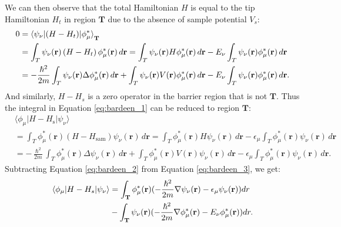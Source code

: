 We can then observe that the total Hamiltonian $H$ is equal to the tip Hamiltonian $H_t$ in region $\mathbf{T}$ due to the absence of sample potential $V_s$: 
\begin{equation}
	\label{eq:bardeen_2}
	\begin{aligned}
		0 &= \braket{\psi_{\nu}|(H-H_t)|\phi_{\mu}^*}_{\mathbf{T}}\\
		 &= \int_{T} \psi_{\nu}(\mathbf{r}) \left( H - H_{t} \right) \phi_{\mu}^*(\mathbf{r}) \, d\mathbf{r} 
		= \int_{T} \psi_{\nu}(\mathbf{r}) H \phi_{\mu}^*(\mathbf{r}) \, d\mathbf{r} 
		- E_{\nu} \int_{T} \psi_{\nu}(\mathbf{r}) \phi_{\mu}^*(\mathbf{r}) \, d\mathbf{r} \\
		&= -\frac{\hslash^2}{2m} \int_{T} \psi_{\nu}(\mathbf{r}) \Delta \phi_{\mu}^*(\mathbf{r}) \, d\mathbf{r} 
		+ \int_{T} \psi_{\nu}(\mathbf{r}) V(\mathbf{r}) \phi_{\mu}^*(\mathbf{r}) \, d\mathbf{r} 
		- E_{\nu} \int_{T} \psi_{\nu}(\mathbf{r}) \phi_{\mu}^*(\mathbf{r}) \, d\mathbf{r}.
	\end{aligned}
\end{equation}
And similarly, $H - H_s$ is a zero operator in the barrier region that is not $\mathbf{T}$. Thus the integral in Equation \ref{eq:bardeen_1} can be reduced to region $\mathbf{T}$:   
\begin{equation}
	\label{eq:bardeen_3}
	\begin{aligned}
		&\langle \phi_{\mu} | H - H_{\text{s}} | \psi_{\nu} \rangle \\
		&= \int_{T} \phi_{\mu}^*(\mathbf{r}) \left( H - H_{\text{sam}} \right) \psi_{\nu}(\mathbf{r}) \, d\mathbf{r} 
		= \int_{T} \phi_{\mu}^*(\mathbf{r}) H \psi_{\nu}(\mathbf{r}) \, d\mathbf{r} 
		- \epsilon_{\mu} \int_{T} \phi_{\mu}^*(\mathbf{r}) \psi_{\nu}(\mathbf{r}) \, d\mathbf{r} \\
		&= -\frac{\hslash^2}{2m} \int_{T} \phi_{\mu}^*(\mathbf{r}) \Delta \psi_{\nu}(\mathbf{r}) \, d\mathbf{r} 
		+ \int_{T} \phi_{\mu}^*(\mathbf{r}) V(\mathbf{r}) \psi_{\nu}(\mathbf{r}) \, d\mathbf{r} 
		- \epsilon_{\mu} \int_{T} \phi_{\mu}^*(\mathbf{r}) \psi_{\nu}(\mathbf{r}) \, d\mathbf{r}.
	\end{aligned}
\end{equation}
Subtracting Equation \ref{eq:bardeen_2} from Equation \ref{eq:bardeen_3}, we get: 
\begin{equation}
	\label{eq:bardeen_matrixelement}
	\begin{aligned}
		\braket{\phi_{\mu}|H-H_s|\psi_{\nu}} &= \int_\mathbf{T}\phi_{\mu}^*(\mathbf{r})(-\frac{\hslash^2}{2m} \nabla \psi_{\nu}(\mathbf{r}) - \epsilon_{\mu}\psi_{\nu}(\mathbf{r}))dr \\ 
		& - \int_\mathbf{T}\psi_{\nu}(\mathbf{r})(-\frac{\hslash^2}{2m} \nabla \phi_{\mu}^*(\mathbf{r}) - E_{\nu}\phi_{\mu}^*(\mathbf{r}))dr.
	\end{aligned}
\end{equation}
